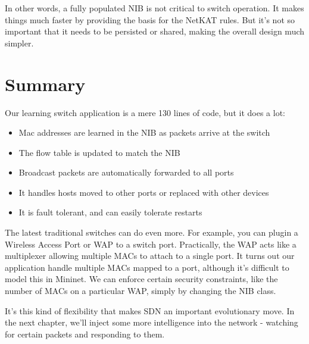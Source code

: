 In other words, a fully populated NIB is not critical to switch operation.  It makes things much faster
by providing the basis for the NetKAT rules.  But it's not so important that it needs to be persisted or
shared, making the overall design much simpler.  

\section{Summary}

Our learning switch application is a mere 130 lines of code, but it does a lot:

\begin{itemize}
\item Mac addresses are learned in the NIB as packets arrive at the switch
\item The flow table is updated to match the NIB
\item Broadcast packets are automatically forwarded to all ports
\item It handles hosts moved to other ports or replaced with other devices
\item It is fault tolerant, and can easily tolerate restarts
\end{itemize}

The latest traditional switches can do even more.  For example, you can plugin a Wireless Access Port or 
WAP to a switch port.  Practically, the WAP acts like a multiplexer allowing multiple MACs to 
attach to a single port.   It turns out our application handle multiple MACs mapped to a port, although it's 
difficult to model this in Mininet.  We can enforce certain security constraints, like the number of MACs on
a particular WAP, simply by changing the NIB class.

It's this kind of flexibility that makes SDN an important evolutionary move.  In the next chapter, we'll
inject some more intelligence into the network - watching for certain packets and responding to them.  